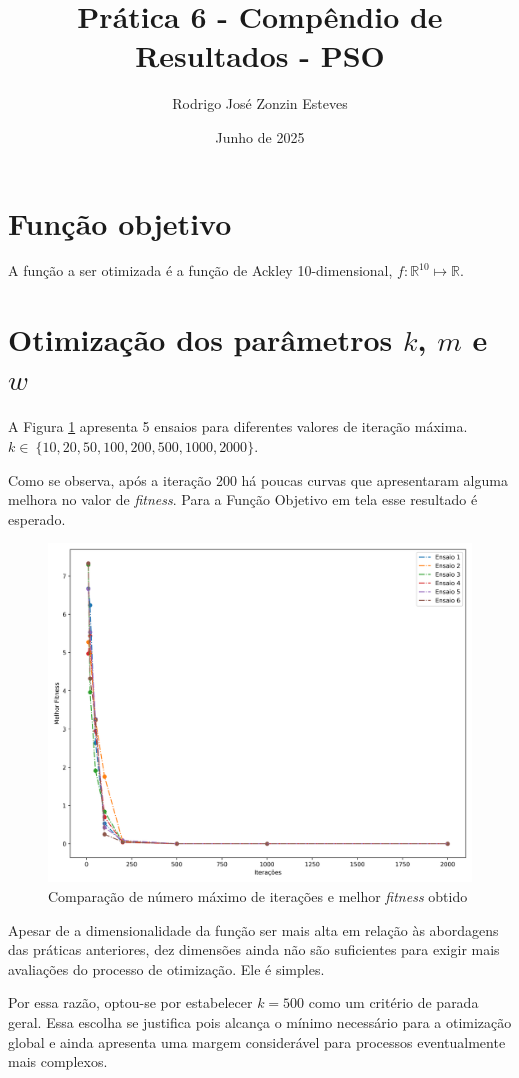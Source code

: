 \documentclass[12pt]{article}
\author{Rodrigo José Zonzin Esteves}
\date{Junho de 2025}
\title{Prática 6 - Compêndio de Resultados - PSO}
\begin{document}
	\maketitle
	
	\section{Função objetivo}
	A função a ser otimizada é a função de Ackley 10-dimensional, $f: \mathbb{R}^{10} \mapsto \mathbb{R}$. 
	
	
	\section{Otimização dos parâmetros $k$, $m$ e $w$ } \label{secotimizacao}
	
	A Figura \ref{fig_variacaoiteracoes} apresenta 5 ensaios para diferentes valores de iteração máxima. \\
	$k \in~\{10, 20, 50, 100, 200, 500, 1000, 2000\}$.
	
	Como se observa, após a iteração 200 há poucas curvas que apresentaram alguma melhora no valor de \textit{fitness}. Para a Função Objetivo em tela esse resultado é esperado. 	
	\begin{figure}[h!]
		\centering
		\includegraphics[width=0.68\linewidth]{../variacao_iteracoes}
		\caption{Comparação de número máximo de iterações e melhor \textit{fitness} obtido}
		\label{fig_variacaoiteracoes}
	\end{figure}
	 Apesar de a dimensionalidade da função ser mais alta em relação às abordagens das práticas anteriores, dez dimensões ainda não são suficientes para exigir mais avaliações do processo de otimização. Ele é simples. 
	
	Por essa razão, optou-se por estabelecer $k=500$ como um critério de parada geral. Essa escolha se justifica pois alcança o mínimo necessário para a otimização global e ainda apresenta uma margem considerável para processos eventualmente mais complexos. 
	
\end{document}
